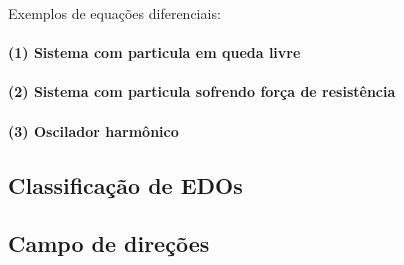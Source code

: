 Exemplos de equações diferenciais:

\paragraph{(1) Sistema com particula em queda livre}

\paragraph{(2) Sistema com particula sofrendo força de resistência}

\paragraph{(3) Oscilador harmônico}


\subsection{Classificação de EDOs}


\subsection{Campo de direções}


